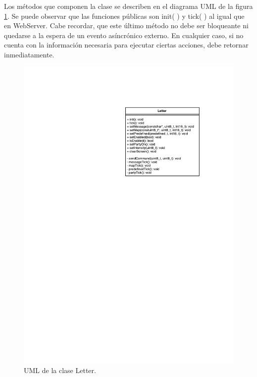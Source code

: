     Los métodos que componen la clase se describen en el diagrama UML de la figura \ref{fig:uml-letter}. Se puede observar que las funciones públicas son init( ) y tick( ) al igual que en WebServer. Cabe recordar, que este último método no debe ser bloqueante ni quedarse a la espera de un evento asíncrónico externo. En cualquier caso, si no cuenta con la información necesaria para ejecutar ciertas acciones, debe retornar inmediatamente.

    \begin{figure}[ht!]
        \centering
        \begin{center}
            \includegraphics[scale=1]{imagenes/Letter.pdf}
            \caption{UML de la clase Letter.}
            \label{fig:uml-letter}
        \end{center}
    \end{figure}


